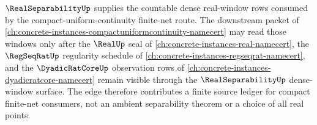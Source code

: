 $\RealSeparabilityUp$ supplies the countable dense real-window rows consumed by the compact-uniform-continuity finite-net route. The downstream packet of \autoref{ch:concrete-instances-compactuniformcontinuity-namecert} may read those windows only after the $\RealUp$ seal of \autoref{ch:concrete-instances-real-namecert}, the $\RegSeqRatUp$ regularity schedule of \autoref{ch:concrete-instances-regseqrat-namecert}, and the $\DyadicRatCoreUp$ observation rows of \autoref{ch:concrete-instances-dyadicratcore-namecert} remain visible through the $\RealSeparabilityUp$ dense-window surface. The edge therefore contributes a finite source ledger for compact finite-net consumers, not an ambient separability theorem or a choice of all real points.
